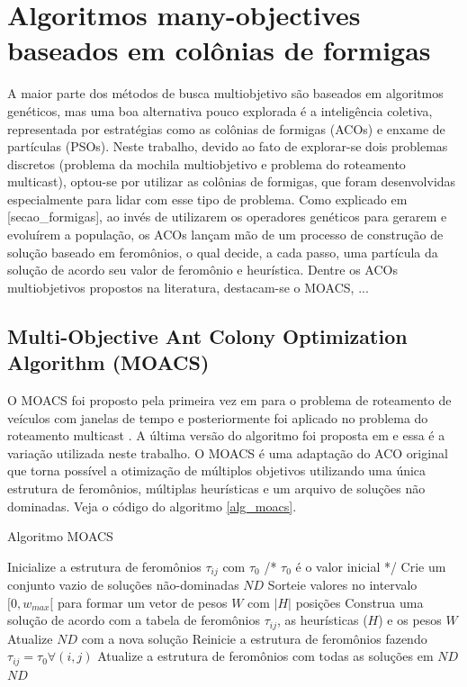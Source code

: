 \section{Algoritmos many-objectives baseados em colônias de formigas}

A maior parte dos métodos de busca multiobjetivo são baseados em algoritmos genéticos, mas uma boa alternativa pouco explorada é a inteligência coletiva, representada por estratégias como as colônias de formigas (ACOs) e enxame de partículas (PSOs). Neste trabalho, devido ao fato de explorar-se dois problemas discretos (problema da mochila multiobjetivo e problema do roteamento multicast), optou-se por utilizar as colônias de formigas, que foram desenvolvidas especialmente para lidar com esse tipo de problema. Como explicado em [secao\_formigas], ao invés de utilizarem os operadores genéticos para gerarem e evoluírem a população, os ACOs lançam mão de um processo de construção de solução baseado em feromônios, o qual decide, a cada passo, uma partícula da solução de acordo seu valor de feromônio e heurística. Dentre os ACOs multiobjetivos propostos na literatura, destacam-se o MOACS, ...

\subsection{Multi-Objective Ant Colony Optimization Algorithm (MOACS)}

O MOACS foi proposto pela primeira vez em \cite{Baran2003} para o problema de roteamento de veículos com janelas de tempo e posteriormente foi aplicado no problema do roteamento multicast \cite{Pinto2005}. A última versão do algoritmo foi proposta em \cite{Riveros2016} e essa é a variação utilizada neste trabalho. O MOACS é uma adaptação do ACO original que torna possível a otimização de múltiplos objetivos utilizando uma única estrutura de feromônios, múltiplas heurísticas e um arquivo de soluções não dominadas. Veja o código do algoritmo \ref{alg_moacs}.

\begin{algorithm}
	\caption{Algoritmo MOACS}
	\label{alg_moacs}
	\begin{algorithmic}[1]
		\State Inicialize a estrutura de feromônios $\tau_{ij}$ com $\tau_0$ /* $\tau_{0}$ é o valor inicial */
		\State Crie um conjunto vazio de soluções não-dominadas $ND$
		\State Sorteie valores no intervalo $[0, w_{max}[$ para formar um vetor de pesos $W$ com $|H|$ posições
		\State Construa uma solução de acordo com a tabela de feromônios $\tau_{ij}$, as heurísticas ($H$) e os pesos $W$
		\State Atualize $ND$ com a nova solução
		\EndFor
		\State Reinicie a estrutura de feromônios fazendo $\tau_{ij} = \tau_0 \forall(i,j)$
		\Else
		\State Atualize a estrutura de feromônios com todas as soluções em $ND$
		\EndIf
		\EndWhile
		\State \Return $ND$
	\end{algorithmic}
\end{algorithm}

